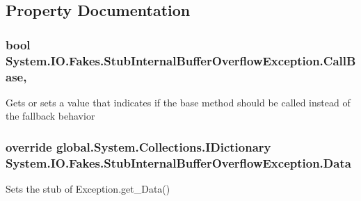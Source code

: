 \subsection{Property Documentation}
\hypertarget{class_system_1_1_i_o_1_1_fakes_1_1_stub_internal_buffer_overflow_exception_a8c875e52f7cb2b26aa9a4816e1f9d4f5}{
\subsubsection[{Call\-Base}]{\setlength{\rightskip}{0pt plus 5cm}bool System.\-I\-O.\-Fakes.\-Stub\-Internal\-Buffer\-Overflow\-Exception.\-Call\-Base\hspace{0.3cm}{\ttfamily [get]}, {\ttfamily [set]}}}\label{class_system_1_1_i_o_1_1_fakes_1_1_stub_internal_buffer_overflow_exception_a8c875e52f7cb2b26aa9a4816e1f9d4f5}


Gets or sets a value that indicates if the base method should be called instead of the fallback behavior

\hypertarget{class_system_1_1_i_o_1_1_fakes_1_1_stub_internal_buffer_overflow_exception_abcf5a2cab3f3ae1cd675a24e1d30f578}{
\subsubsection[{Data}]{\setlength{\rightskip}{0pt plus 5cm}override global.\-System.\-Collections.\-I\-Dictionary System.\-I\-O.\-Fakes.\-Stub\-Internal\-Buffer\-Overflow\-Exception.\-Data\hspace{0.3cm}{\ttfamily [get]}}}\label{class_system_1_1_i_o_1_1_fakes_1_1_stub_internal_buffer_overflow_exception_abcf5a2cab3f3ae1cd675a24e1d30f578}


Sets the stub of Exception.\-get\-\_\-\-Data()

